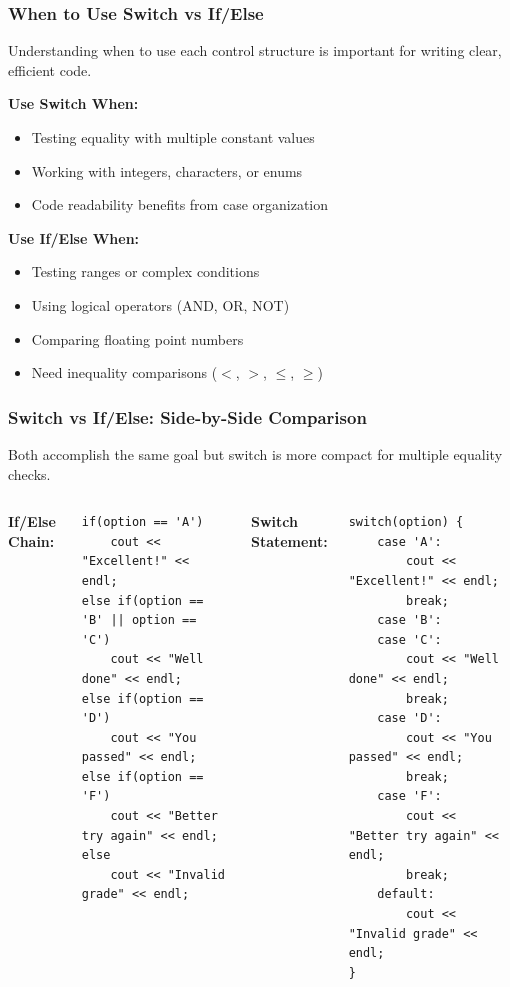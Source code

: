 \documentclass{beamer}
\begin{document}
\begin{frame}
\frametitle{When to Use Switch vs If/Else}
Understanding when to use each control structure is important for writing clear, efficient code.

\textbf{Use Switch When:}
\begin{itemize}
\item Testing equality with multiple constant values
\pause
\item Working with integers, characters, or enums
\pause
\item Code readability benefits from case organization
\end{itemize}

\textbf{Use If/Else When:}
\begin{itemize}
\item Testing ranges or complex conditions
\pause
\item Using logical operators (AND, OR, NOT)
\pause
\item Comparing floating point numbers
\pause
\item Need inequality comparisons ($<$, $>$, $\leq$, $\geq$)
\end{itemize}
\end{frame}

\begin{frame}[fragile]
\frametitle{Switch vs If/Else: Side-by-Side Comparison}
Both accomplish the same goal but switch is more compact for multiple equality checks.

\begin{columns}[t]
\textbf{If/Else Chain:}
\begin{verbatim}
if(option == 'A')
    cout << "Excellent!" << endl;
else if(option == 'B' || option == 'C')
    cout << "Well done" << endl;
else if(option == 'D')
    cout << "You passed" << endl;
else if(option == 'F')
    cout << "Better try again" << endl;
else
    cout << "Invalid grade" << endl;
\end{verbatim}

\textbf{Switch Statement:}
\begin{verbatim}
switch(option) {
    case 'A':
        cout << "Excellent!" << endl;
        break;
    case 'B':
    case 'C':
        cout << "Well done" << endl;
        break;
    case 'D':
        cout << "You passed" << endl;
        break;
    case 'F':
        cout << "Better try again" << endl;
        break;
    default:
        cout << "Invalid grade" << endl;
}
\end{verbatim}
\end{columns}
\end{frame}
\end{document}
